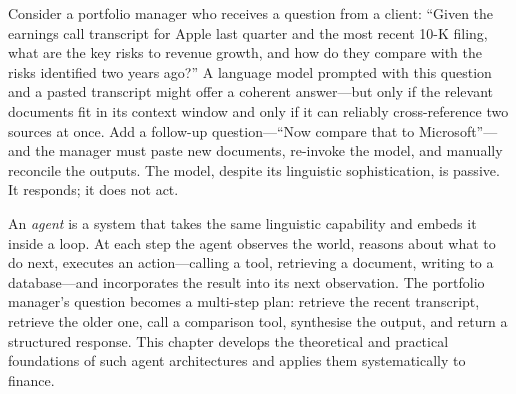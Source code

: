 \begin{context}
Consider a portfolio manager who receives a question from a client: ``Given the
earnings call transcript for Apple last quarter and the most recent 10-K filing,
what are the key risks to revenue growth, and how do they compare with the risks
identified two years ago?'' A language model prompted with this question and a
pasted transcript might offer a coherent answer---but only if the relevant documents
fit in its context window and only if it can reliably cross-reference two sources at
once. Add a follow-up question---``Now compare that to Microsoft''---and the manager
must paste new documents, re-invoke the model, and manually reconcile the outputs.
The model, despite its linguistic sophistication, is passive. It responds; it does
not act.

An \emph{agent} is a system that takes the same linguistic capability and embeds it
inside a loop. At each step the agent observes the world, reasons about what to do
next, executes an action---calling a tool, retrieving a document, writing to a
database---and incorporates the result into its next observation. The portfolio
manager's question becomes a multi-step plan: retrieve the recent transcript, retrieve
the older one, call a comparison tool, synthesise the output, and return a structured
response. This chapter develops the theoretical and practical foundations of such
agent architectures and applies them systematically to finance.
\end{context}


